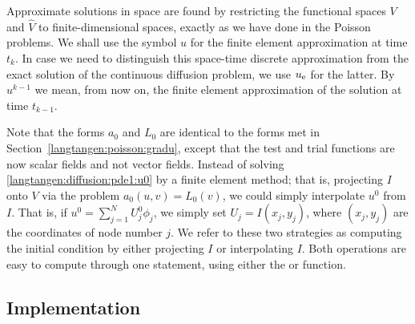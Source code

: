 Approximate solutions in space are found by restricting the functional
spaces $V$ and $\hat V$ to finite-dimensional spaces, exactly as we have
done in the Poisson problems.  We shall use the symbol $u$ for the finite
element approximation at time $t_k$. In case we need to distinguish
this space-time discrete approximation from the exact solution of the
continuous diffusion problem, we use $u_{\rm e}$ for the latter.  By $u^{k-1}$
we mean, from now on, the finite element approximation of the solution
at time $t_{k-1}$.

Note that the forms $a_0$ and $L_0$ are identical to the forms met in
Section~\ref{langtangen:poisson:gradu}, except that the test and trial
functions are now scalar fields and not vector fields.  Instead of
solving \eqref{langtangen:diffusion:pde1:u0} by a finite element method;
that is, projecting $I$ onto $V$ via the problem $a_0(u,v)=L_0(v)$, we
could simply interpolate $u^0$ from $I$. That is, if $u^0=\sum_{j=1}^N
U^0_j\phi_j$, we simply set $U_j=I(x_j,y_j)$, where $(x_j,y_j)$ are
the coordinates of node number $j$. We refer to these two strategies as
computing the initial condition by either projecting $I$ or interpolating
$I$.  Both operations are easy to compute through one statement, using
either the  or  function.

\subsection{Implementation}
\label{langtangen:timedep:diffusion1:impl}

